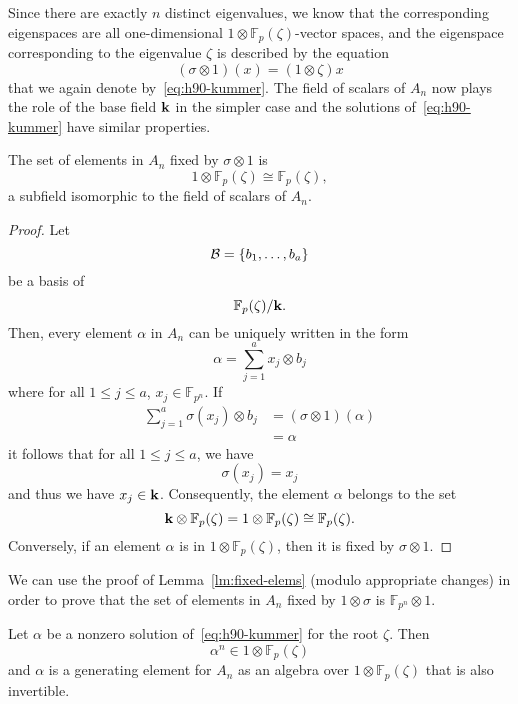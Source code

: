 Since there are exactly $n$ distinct eigenvalues, we know that the
corresponding eigenspaces are all one-dimensional
$1\otimes\mathbb{F}_{p}(\zeta)$-vector spaces, and the eigenspace corresponding
to the eigenvalue $\zeta$ is described by the equation
 \begin{equation}
   \tag{H90}
   (\sigma\otimes1)(x) = (1\otimes\zeta) x
   \label{eq:h90-kummer}
 \end{equation}
 that we again denote by~\eqref{eq:h90-kummer}. The field of scalars of $A_n$ now
 plays the role of the base field $\mathbf{k}$ in the simpler case and the solutions
 of~\eqref{eq:h90-kummer} have similar properties.
 \begin{lm}
   \label{lm:fixed-elems}
   The set of elements in $A_n$ fixed by $\sigma\otimes1$ is
   \[
     1\otimes\mathbb{F}_{p}(\zeta)\cong \mathbb{F}_{p}(\zeta),
   \]
   a subfield isomorphic to the field of scalars of $A_n$.
 \end{lm}
 \begin{proof}
   Let 
   \[
     \mathcal{B} = \left\{ b_1, \dots, b_a \right\}
   \]
   be a basis of
   \[
     \mathbb{F}_p(\zeta)/\mathbf{k}.
   \]
   Then, every element $\alpha$ in $A_n$ can be uniquely written in the form
   \[
     \alpha = \sum_{j=1}^a x_j\otimes b_j
   \]
   where for all $1\leq j\leq a$, $x_j\in\mathbb{F}_{p^n}$. If 
   \begin{align*}
     \sum_{j=1}^a\sigma(x_j)\otimes b_j &= (\sigma\otimes1)(\alpha)\\
     &= \alpha
   \end{align*}
 it follows that for all $1\leq j\leq a$, we have
   \[
     \sigma(x_j) = x_j
   \]
   and thus we have $x_j\in\mathbf{k}$. Consequently, the element $\alpha$ belongs to
   the set
   \[
     \mathbf{k}\otimes\mathbb{F}_{p}(\zeta) =
     1\otimes\mathbb{F}_p(\zeta)\cong\mathbb{F}_p(\zeta).
   \]
   Conversely, if an element $\alpha$ is in $1\otimes\mathbb{F}_{p}(\zeta)$,
   then it is fixed by $\sigma\otimes1$.
 \end{proof}
 \begin{rem}
   \label{rem:fixed-elems}
   We can use the proof of Lemma~\ref{lm:fixed-elems} (modulo appropriate
   changes) in order to prove that the set of elements in $A_n$ fixed by
   $1\otimes\sigma$ is $\mathbb{F}_{p^n}\otimes1.$
 \end{rem}
 \begin{lm}
   \label{lm:h90-solutions}
   Let $\alpha$ be a nonzero solution of~\eqref{eq:h90-kummer} for the root
   $\zeta$. Then 
   \[
     \alpha^n\in 1\otimes\mathbb{F}_{p}(\zeta)
   \]
   and $\alpha$ is a generating element for $A_n$ as an algebra over
   $1\otimes\mathbb{F}_{p}(\zeta)$ that is also invertible.
 \end{lm}

